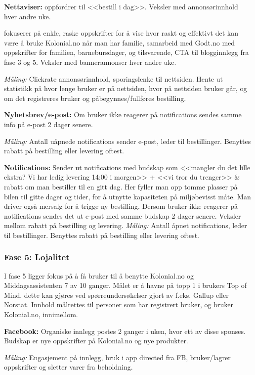 \textbf{Nettaviser:}  oppfordrer til <<bestill i dag>>. Veksler med annonsørinnhold hver andre uke. 

 fokuserer på enkle, raske oppskrifter for å vise hvor raskt og effektivt det kan være å bruke Kolonial.no når man har familie, samarbeid med Godt.no med oppskrifter for familien, barnebursdager, og tilsvarende, CTA til blogginnlegg fra fase 3 og 5. Veksler med bannerannonser hver andre uke. 

\textit{Måling:} Clickrate annonsørinnhold, sporingslenke til nettsiden. Hente ut statistikk på hvor lenge bruker er på nettsiden, hvor på nettsiden bruker går, og om det registreres bruker og påbegynnes/fullføres bestilling. 

\textbf{Nyhetsbrev/e-post:} Om bruker ikke reagerer på notifications sendes samme info på e-post 2 dager senere. 

\textit{Måling:} Antall uåpnede notifications sender e-post, leder til bestillinger. Benyttes rabatt på bestilling eller levering oftest. 

\textbf{Notifications:} Sender ut notifications med budskap som <<mangler du det lille ekstra? Vi har ledig levering 14:00 i morgen>> + <<vi tror du trenger>> & rabatt om man bestiller til en gitt dag. Her fyller man opp tomme plasser på bilen til gitte dager og tider, for å utnytte kapasiteten på miljøbevisst måte. Man driver også mersalg for å trigge ny bestilling. Dersom bruker ikke reagerer på notifications sendes det ut e-post med samme budskap 2 dager senere. Veksler mellom rabatt på bestilling og levering. 
\textit{Måling:} Antall åpnet notifications, leder til bestillinger. Benyttes rabatt på bestilling eller levering oftest. 

\subsubsection{\textbf{Fase 5: Lojalitet}}
I fase 5 ligger fokus på å få bruker til å benytte Kolonial.no og Middagsassistenten 7 av 10 ganger. Målet er å havne på topp 1 i brukers Top of Mind, dette kan gjøres ved spørreundersøkelser gjort av f.eks. Gallup eller Norstat. Innhold målrettes til personer som har registrert bruker, og bruker Kolonial.no, innimellom. 

\textbf{Facebook:} Organiske innlegg postes 2 ganger i uken, hvor ett av disse sponses. Budskap er nye oppskrifter på Kolonial.no og nye produkter. 

\textit{Måling:} Engasjement på innlegg, bruk i app directed fra FB, bruker/lagrer oppskrifter og sletter varer fra beholdning. 

